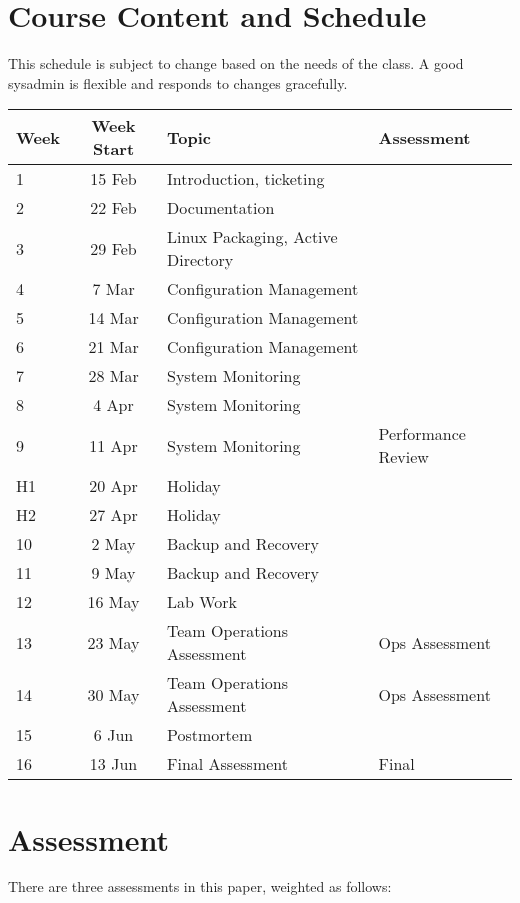 \documentclass{article}
\begin{document}

\section*{Course Content and Schedule}
This schedule is subject to change based on the needs of the class. A good sysadmin is flexible and responds to changes gracefully.

\renewcommand{\arraystretch}{1.5}
\begin{tabular}{|l|c|l|l|}
\hline
 Week & Week Start & Topic                   & Assessment     \\ \hline
 1    & 15 Feb     & Introduction, ticketing & \\ \hline
 2    & 22 Feb     & Documentation           & \\ \hline
 3    & 29 Feb     & Linux Packaging, Active Directory  & \\ \hline
 4    &  7 Mar     & Configuration Management &    \\ \hline
5    & 14 Mar     & Configuration Management &     \\ \hline
6    & 21 Mar     & Configuration Management &     \\ \hline
 7    & 28 Mar     & System Monitoring  &  \\ \hline
 8   &  4 Apr     & System Monitoring  & \\ \hline
 9   & 11 Apr     & System Monitoring  & Performance Review\\ \hline
 H1    & 20 Apr     & Holiday \\ \hline
 H2    & 27 Apr     & Holiday  &          \\ \hline
 10   &  2 May     & Backup and Recovery & \\ \hline
 11   & 9 May     & Backup and Recovery &  \\ \hline
 12   & 16 May     & Lab Work &  \\ \hline
 13   & 23 May     & Team Operations Assessment &  Ops Assessment \\ \hline
 14   &  30 May     & Team Operations Assessment &  Ops Assessment \\ \hline
 15   &  6 Jun     & Postmortem &  \\ \hline
 16   & 13 Jun     & Final Assessment & Final \\ \hline
\end{tabular}

\newpage 

\section*{Assessment}
There are three assessments in this paper, weighted as follows:
\end{document}
